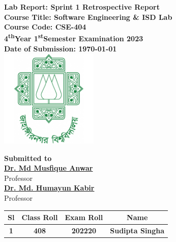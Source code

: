 \documentclass[a4paper,12pt]{article}
\begin{document}
\begin{center}
    \textbf{\large{Lab Report: Sprint 1 Retrospective Report}}\\
    \vspace{0.2cm}
    \textbf{Course Title: Software Engineering \& ISD Lab}\\
    \vspace{0.2cm}
    \textbf{Course Code: CSE-404}\\
    \vspace{0.2cm}
    \textbf{4\textsuperscript{th}Year 1\textsuperscript{st}Semester Examination 2023}\\
    \vspace{0.5cm}
    \textbf{Date of Submission: \today}\\

    \vspace{1.5cm}
    \includegraphics[width=0.35\textwidth]{images/logo.png}\\ %
    \vspace{1cm}

    \textbf{Submitted to}\\
    \vspace{0.2cm}
    \textbf{\href{https://juniv.edu/teachers/musfique.anwar}{Dr. Md Musfique Anwar}}\\
    {Professor}\\
    \vspace{0.2cm}
    \textbf{\href{https://juniv.edu/teachers/hkabir}{Dr. Md. Humayun Kabir}}\\
    {Professor}\\


    \vspace{1cm}

    \begin{table}[h!]
        \centering
        \begin{tabular}{|c|c|c|c|}
            \hline
            \rowcolor[HTML]{2F4F4F} %
            {\color[HTML]{FFFFFF}\textbf{Sl}}& {\color[HTML]{FFFFFF}\textbf{Class Roll}}& {\color[HTML]{FFFFFF}\textbf{Exam Roll}}& {\color[HTML]{FFFFFF}\textbf{Name}}\\ \hline
            \rowcolor[HTML]{B0E0E6}
            \textbf{1}& \textbf{408} & \textbf{202220} & \textbf{Sudipta Singha} \\ \hline
       

\end{tabular}
\end{table}
\end{center}
\end{document}
